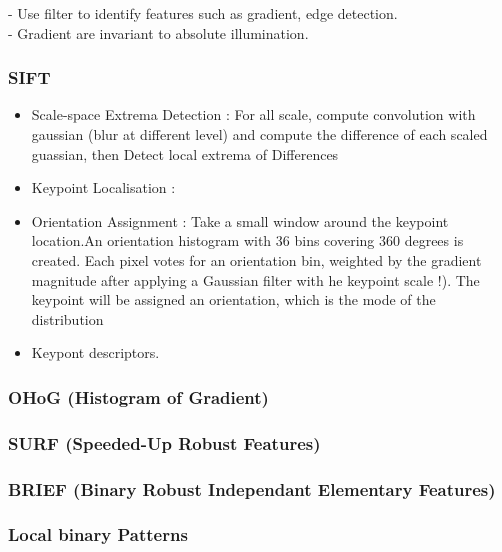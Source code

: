 		- Use filter to identify features such as gradient, edge detection.\\
		- Gradient are invariant to absolute illumination.

	\subsubsection{SIFT}

	\begin{itemize}
		\item Scale-space Extrema Detection : For all scale, compute convolution with gaussian (blur at different level) and compute the difference of each scaled guassian, then Detect local extrema of Differences
		\item Keypoint Localisation : 
		\item Orientation Assignment : Take a small window around the keypoint location.An orientation histogram with 36 bins
		covering 360 degrees is created.
		Each pixel votes for an orientation bin,
		weighted by the gradient magnitude
		after applying a Gaussian filter with
		he keypoint scale !).
		The keypoint will be assigned an
		orientation, which is the mode of the
		distribution
		\item Keypont descriptors.
	\end{itemize}

	\subsubsection{OHoG (Histogram of Gradient)} %
	\label{sub:hog_}
	
	
	\subsubsection{SURF (Speeded-Up Robust Features)} %
	\label{sub:surf}
	

	\subsubsection{BRIEF (Binary Robust Independant Elementary Features)} %
	\label{sub:brief_}
	

	\subsubsection{Local binary Patterns} %
	\label{sub:local_binary_patterns}
	
